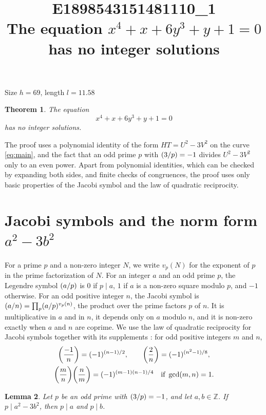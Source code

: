 \documentclass[11pt]{article}
\title{\textbf{E1898543151481110\_1}\\[4pt] {\Large The equation $x^{4}+x+6y^{3}+y+1=0$ has no integer solutions}}
\author{}
\date{}
\newtheorem{theorem}{Theorem}
\newtheorem{lemma}[theorem]{Lemma}
\newcommand{\Z}{\mathbb{Z}}
\newcommand{\leg}[2]{\mathchoice{\biggl(\dfrac{#1}{#2}\biggr)}{(#1/#2)}{(#1/#2)}{(#1/#2)}}
\begin{document}
\maketitle
\vspace{-8ex}
\begin{center}
Size $h=69$, length $l=11.58$
\end{center}

\begin{theorem}\label{thm:main}
The equation
\begin{equation}\label{eq:main}
x^{4}+x+6y^{3}+y+1=0
\end{equation}
has no integer solutions.
\end{theorem}

The proof uses a polynomial identity of the form $HT=U^2-3V^2$ on the curve \eqref{eq:main}, and the fact that an odd prime $p$ with $\leg{3}{p}=-1$ divides $U^2-3V^2$ only to an even power. Apart from polynomial identities, which can be checked by expanding both sides, and finite checks of congruences, the proof uses only basic properties of the Jacobi symbol and the law of quadratic reciprocity.

\section{\texorpdfstring{Jacobi symbols and the norm form $a^2-3b^2$}{Jacobi symbols and the norm form}}

For a prime $p$ and a non-zero integer $N$, we write $v_p(N)$ for the exponent of $p$ in the prime factorization of $N$. For an integer $a$ and an odd prime $p$, the Legendre symbol $\leg{a}{p}$ is $0$ if $p\mid a$, $1$ if $a$ is a non-zero square modulo $p$, and $-1$ otherwise. For an odd positive integer $n$, the Jacobi symbol is $\leg{a}{n}=\prod_p\leg{a}{p}^{v_p(n)}$, the product over the prime factors $p$ of $n$. It is multiplicative in $a$ and in $n$, it depends only on $a$ modulo $n$, and it is non-zero exactly when $a$ and $n$ are coprime. We use the law of quadratic reciprocity for Jacobi symbols together with its supplements \cite[Chapter~5, \S2]{IR}: for odd positive integers $m$ and $n$,
\begin{gather*}
\leg{-1}{n}=(-1)^{(n-1)/2},\qquad\leg{2}{n}=(-1)^{(n^2-1)/8},\\
\leg{m}{n}\leg{n}{m}=(-1)^{(m-1)(n-1)/4}\quad\text{if }\gcd(m,n)=1.
\end{gather*}

\begin{lemma}\label{lem:divides}
Let $p$ be an odd prime with $\leg{3}{p}=-1$, and let $a,b\in\Z$. If $p\mid a^2-3b^2$, then $p\mid a$ and $p\mid b$.
\end{lemma}
\end{document}
